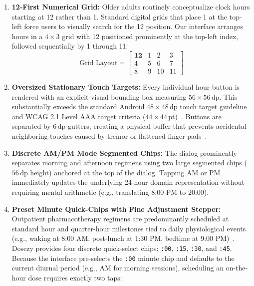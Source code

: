 \documentclass[11pt,a4paper]{article}
\begin{document}
\begin{enumerate}[leftmargin=*]
    \item \textbf{12-First Numerical Grid:} Older adults routinely conceptualize clock hours starting at 12 rather than 1. Standard digital grids that place 1 at the top-left force users to visually search for the 12 position. Our interface arranges hours in a $4 \times 3$ grid with 12 positioned prominently at the top-left index, followed sequentially by 1 through 11:
    \begin{equation}
        \text{Grid Layout} = \begin{bmatrix}
            \mathbf{12} & 1 & 2 & 3 \\
            4 & 5 & 6 & 7 \\
            8 & 9 & 10 & 11
        \end{bmatrix}
    \end{equation}
    \item \textbf{Oversized Stationary Touch Targets:} Every individual hour button is rendered with an explicit visual bounding box measuring $56 \times 56\,\text{dp}$. This substantially exceeds the standard Android $48 \times 48\,\text{dp}$ touch target guideline and WCAG 2.1 Level AAA target criteria ($44 \times 44\,\text{pt}$)~\cite{w3c2018wcag}. Buttons are separated by $6\,\text{dp}$ gutters, creating a physical buffer that prevents accidental neighboring touches caused by tremor or flattened finger pads~\cite{siek2006fat}.
    \item \textbf{Discrete AM/PM Mode Segmented Chips:} The dialog prominently separates morning and afternoon regimens using two large segmented chips ($56\,\text{dp}$ height) anchored at the top of the dialog. Tapping AM or PM immediately updates the underlying 24-hour domain representation without requiring mental arithmetic (e.g., translating 8:00 PM to 20:00).
    \item \textbf{Preset Minute Quick-Chips with Fine Adjustment Stepper:} Outpatient pharmacotherapy regimens are predominantly scheduled at standard hour and quarter-hour milestones tied to daily physiological events (e.g., waking at 8:00 AM, post-lunch at 1:30 PM, bedtime at 9:00 PM)~\cite{ada2023standards}. Dosezy provides four discrete quick-select chips: \texttt{:00}, \texttt{:15}, \texttt{:30}, and \texttt{:45}. Because the interface pre-selects the \texttt{:00} minute chip and defaults to the current diurnal period (e.g., AM for morning sessions), scheduling an on-the-hour dose requires exactly two taps:
    \begin{equation}

\end{equation}
\end{enumerate}
\end{document}
